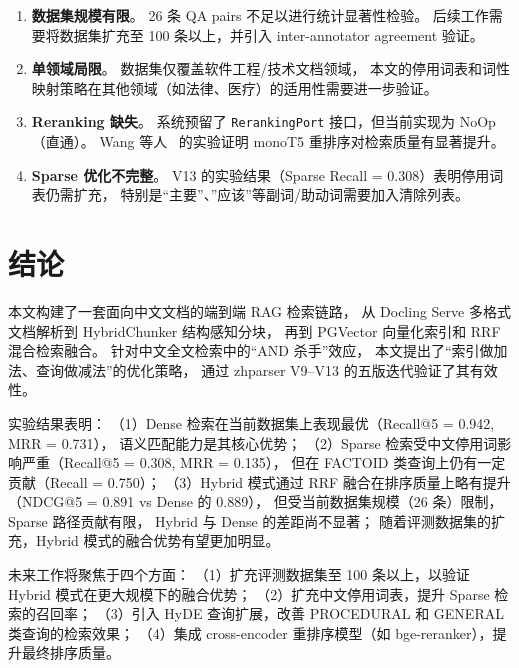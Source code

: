 \documentclass[a4paper, 12pt]{ctexart}
\begin{document}
\begin{enumerate}
  \item \textbf{数据集规模有限}。
  26 条 QA pairs 不足以进行统计显著性检验。
  后续工作需要将数据集扩充至 100 条以上，并引入 inter-annotator agreement 验证。

  \item \textbf{单领域局限}。
  数据集仅覆盖软件工程/技术文档领域，
  本文的停用词表和词性映射策略在其他领域（如法律、医疗）的适用性需要进一步验证。

  \item \textbf{Reranking 缺失}。
  系统预留了 \texttt{RerankingPort} 接口，但当前实现为 NoOp（直通）。
  Wang 等人~\cite{wang2024rag_bpractices} 的实验证明 monoT5 重排序对检索质量有显著提升。

  \item \textbf{Sparse 优化不完整}。
  V13 的实验结果（Sparse Recall = 0.308）表明停用词表仍需扩充，
  特别是``主要''、''应该''等副词/助动词需要加入清除列表。
\end{enumerate}

\section{结论}

本文构建了一套面向中文文档的端到端 RAG 检索链路，
从 Docling Serve 多格式文档解析到 HybridChunker 结构感知分块，
再到 PGVector 向量化索引和 RRF 混合检索融合。
针对中文全文检索中的``AND 杀手''效应，
本文提出了``索引做加法、查询做减法''的优化策略，
通过 zhparser V9--V13 的五版迭代验证了其有效性。

实验结果表明：
（1）Dense 检索在当前数据集上表现最优（Recall@5 = 0.942, MRR = 0.731），
语义匹配能力是其核心优势；
（2）Sparse 检索受中文停用词影响严重（Recall@5 = 0.308, MRR = 0.135），
但在 FACTOID 类查询上仍有一定贡献（Recall = 0.750）；
（3）Hybrid 模式通过 RRF 融合在排序质量上略有提升（NDCG@5 = 0.891 vs Dense 的 0.889），
但受当前数据集规模（26 条）限制，Sparse 路径贡献有限，
Hybrid 与 Dense 的差距尚不显著；
随着评测数据集的扩充，Hybrid 模式的融合优势有望更加明显。

未来工作将聚焦于四个方面：
（1）扩充评测数据集至 100 条以上，以验证 Hybrid 模式在更大规模下的融合优势；
（2）扩充中文停用词表，提升 Sparse 检索的召回率；
（3）引入 HyDE 查询扩展，改善 PROCEDURAL 和 GENERAL 类查询的检索效果；
（4）集成 cross-encoder 重排序模型（如 bge-reranker），提升最终排序质量。

\newpage

\end{document}
